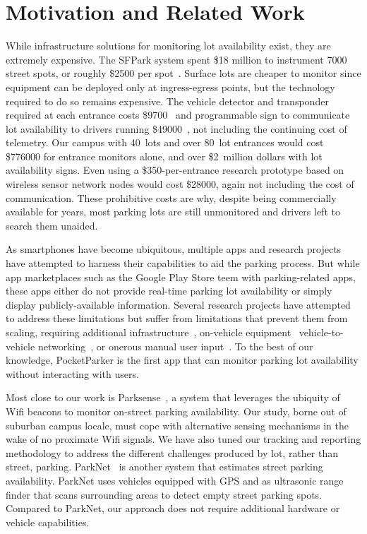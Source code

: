 \section{Motivation and Related Work}

While infrastructure solutions for monitoring lot availability exist, they
are extremely expensive. The SFPark system spent \$18 million to instrument
\num{7000} street spots, or roughly \$\num{2500} per spot~\cite{sfpark}.
Surface lots are cheaper to monitor since equipment can be deployed only at
ingress-egress points, but the technology required to do so remains
expensive. The vehicle detector and transponder required at each entrance
costs \$\num{9700}~\cite{car-detect} and programmable sign to communicate lot
availability to drivers running \$\num{49000}~\cite{mstp-park}, not including
the continuing cost of telemetry. Our campus with 40~lots and over 80~lot
entrances would cost \$\num{776000} for entrance monitors alone, and over
\$2~million dollars with lot availability signs. Even using a
\$\num{350}-per-entrance research prototype based on wireless sensor network
nodes would cost \$\num{28000}, again not including the cost of
communication. These prohibitive costs are why, despite being commercially
available for years, most parking lots are still unmonitored and drivers left
to search them unaided.

As smartphones have become ubiquitous, multiple apps and research projects
have attempted to harness their capabilities to aid the parking process. But
while app marketplaces such as the Google Play Store teem with
parking-related apps, these apps either do not provide real-time parking lot
availability or simply display publicly-available information. Several
research projects have attempted to address these limitations but suffer from
limitations that prevent them from scaling, requiring additional
infrastructure~\cite{5062057}, on-vehicle equipment~\cite{Mathur:2010:PDS}
vehicle-to-vehicle networking~\cite{Delot:2009:CRP, Mathur:2010:PDS}, or
onerous manual user input~\cite{Chen:2012:COS}. To the best of our knowledge,
PocketParker is the first app that can monitor parking lot availability
without interacting with users.

Most close to our work is Parksense~\cite{Nawaz:2013:PSB}, a system that
leverages the ubiquity of Wifi beacons to monitor on-street parking
availability. Our study, borne out of suburban campus locale, must cope with
alternative sensing mechanisms in the wake of no proximate Wifi signals. We
have also tuned our tracking and reporting methodology to address the
different challenges produced by lot, rather than street, parking.
ParkNet~\cite{Mathur:2010:PDS} is another system that estimates street
parking availability. ParkNet uses vehicles equipped with GPS and as
ultrasonic range finder that scans surrounding areas to detect empty street
parking spots. Compared to ParkNet, our approach does not require additional
hardware or vehicle capabilities.

